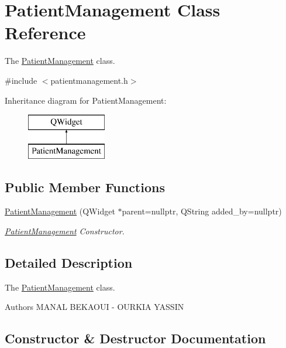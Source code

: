 \hypertarget{class_patient_management}{}\section{Patient\+Management Class Reference}
\label{class_patient_management}


The \mbox{\hyperlink{class_patient_management}{Patient\+Management}} class.  




{\ttfamily \#include $<$patientmanagement.\+h$>$}

Inheritance diagram for Patient\+Management\+:\begin{figure}[H]
\begin{center}
\leavevmode
\includegraphics[height=2.000000cm]{class_patient_management}
\end{center}
\end{figure}
\subsection*{Public Member Functions}
\begin{DoxyCompactItemize}
\item 
\mbox{\hyperlink{class_patient_management_a33cab438cb0409f198366a56f68c8181}{Patient\+Management}} (Q\+Widget $\ast$parent=nullptr, Q\+String added\+\_\+by=nullptr)
\begin{DoxyCompactList}\small\item\em \mbox{\hyperlink{class_patient_management}{Patient\+Management}} Constructor. \end{DoxyCompactList}\end{DoxyCompactItemize}


\subsection{Detailed Description}
The \mbox{\hyperlink{class_patient_management}{Patient\+Management}} class. 

\begin{DoxyAuthor}{Authors}
M\+A\+N\+AL B\+E\+K\+A\+O\+UI -\/ O\+U\+R\+K\+IA Y\+A\+S\+S\+IN 
\end{DoxyAuthor}


\subsection{Constructor \& Destructor Documentation}
\mbox{\label{class_patient_management_a33cab438cb0409f198366a56f68c8181}} 
